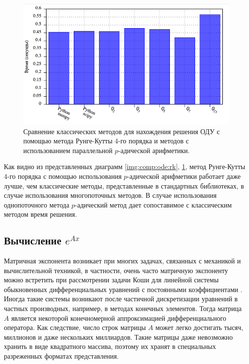 \documentclass[master, och, diploma, times]{sty/SCWorks}
\theoremstyle{plain}
\theoremstyle{definition}
\numberwithin{equation}{section}
\begin{document}
\begin{figure}[H]
\centerline{\includegraphics[width=0.85\linewidth]{../gnuplot/multi/rk/multi.png}}
\caption{Сравнение классических методов для нахождения решения ОДУ с помощью метода Рунге-Кутты 4-го порядка и методов с использованием параллельной $p$-адической арифметики.}
\label{img:comp:ode:rk:multi}
\end{figure}

Как видно из представленных диаграмм \ref{img:comp:ode:rk}, \ref{img:comp:ode:rk:multi}, метод Рунге-Кутты 4-го порядка с помощью использования $p$-адической арифметики работает даже лучше, чем классические методы, представленные в стандартных библиотеках, в случае использования многопоточных методов. В случае использования однопоточного метода $p$-адический метод дает сопоставимое с классическим методом время решения.

\subsection{Вычисление $e^{Ax}$}

Матричная экспонента возникает при многих задачах, связанных с механикой и вычислительной техникой, в частности, очень часто матричную экспоненту можно встретить при рассмотрении задачи Коши для линейной системы обыкновенных дифференциальных уравнений с постоянными коэффициентами \cite{bib:ode:2}. Иногда такие системы возникают после частичной дискретизации уравнений в частных производных, например, в методах конечных элементов. Тогда матрица $A$ является некоторой конечномерной аппроксимацией дифференциального оператора. Как следствие, число строк матрицы $A$ может легко достигать тысяч, миллионов и даже нескольких миллиардов\cite{bib:ode:3}. Такие матрицы даже невозможно хранить в виде квадратного массива, поэтому их хранят в специальных разреженных форматах представления.
\end{document}

